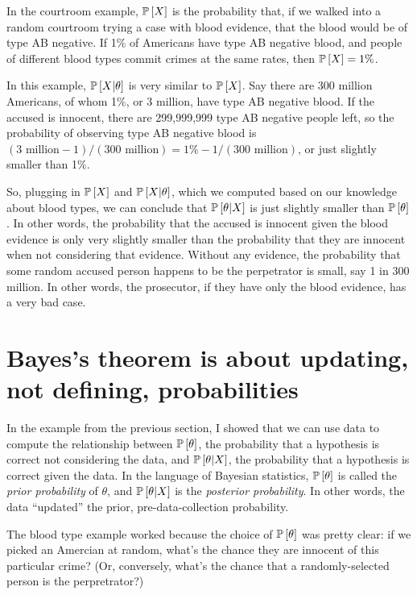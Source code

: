 In the courtroom example, $\mathbb{P}\left[{X}\right]$ is the probability that, if we walked into a random courtroom trying a case with blood evidence, that the blood would be of type AB negative. If 1\% of Americans have type AB negative blood, and people of different blood types commit crimes at the same rates, then $\mathbb{P}\left[{X}\right] = 1\%$.

In this example, $\mathbb{P}\left[{X | \theta}\right]$ is very similar to $\mathbb{P}\left[{X}\right]$. Say there are 300 million Americans, of whom 1\%, or 3 million, have type AB negative blood. If the accused is innocent, there are 299,999,999 type AB negative people left, so the probability of observing type AB negative blood is $(3\text{ million} - 1) / (300\text{ million}) = 1\% - 1 / (300\text{ million})$, or just slightly smaller than 1\%.

So, plugging in $\mathbb{P}\left[{X}\right]$ and $\mathbb{P}\left[{X | \theta}\right]$, which we computed based on our knowledge about blood types, we can conclude that $\mathbb{P}\left[{\theta | X}\right]$ is just slightly smaller than $\mathbb{P}\left[{\theta}\right]$. In other words, the probability that the accused is innocent given the blood evidence is only very slightly smaller than the probability that they are innocent when not considering that evidence. Without any evidence, the probability that some random accused person happens to be the perpetrator is small, say 1 in 300 million. In other words, the prosecutor, if they have only the blood evidence, has a very bad case.

\section{Bayes's theorem is about updating, not defining, probabilities}

In the example from the previous section, I showed that we can use data to compute the relationship between $\mathbb{P}\left[{\theta}\right]$, the probability that a hypothesis is correct not considering the data, and $\mathbb{P}\left[{\theta | X}\right]$, the probability that a hypothesis is correct given the data. In the language of Bayesian statistics, $\mathbb{P}\left[{\theta}\right]$ is called the \emph{prior probability} of $\theta$, and $\mathbb{P}\left[{\theta | X}\right]$ is the \emph{posterior probability}. In other words, the data ``updated'' the prior, pre-data-collection probability.

The blood type example worked because the choice of $\mathbb{P}\left[{\theta}\right]$ was pretty clear: if we picked an Amercian at random, what's the chance they are innocent of this particular crime? (Or, conversely, what's the chance that a randomly-selected person is the perpretrator?)

